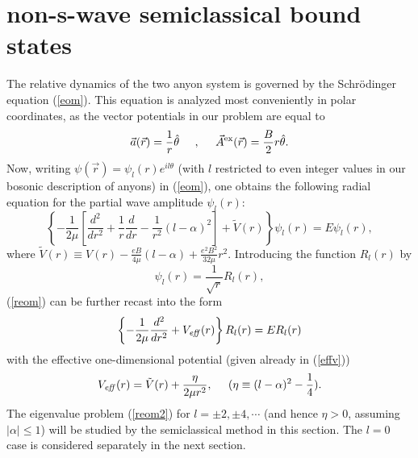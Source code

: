 \documentclass[a4paper,aps,eqsecnum,preprint,preprintnumbers,12pt]{revtex4}
\begin{document}
\section{non-s-wave semiclassical bound states}

The relative dynamics of the two anyon system is governed by the
Schr\"{o}dinger equation (\ref{eom}). This equation is analyzed
most conveniently in polar coordinates, as the vector potentials
in our problem are equal to
\begin{equation}
\vec{a}(\vec{r}) = \frac{1}{r} \hat{\theta} \;\;\;\;\; ,
\;\;\;\;\; \vec{A}^{\rm ex}(\vec{r}) = \frac{B}{2} r \hat{\theta}.
\end{equation}
Now, writing $\psi(\vec{r}) = \psi_{l}(r) e^{il\theta}$ (with $l$
restricted to even integer values in our bosonic description of
anyons) in (\ref{eom}), one obtains the following radial equation
for the partial wave amplitude $\psi_{l}(r)$:
\begin{equation} \label{reom}
\left\{ -\frac{1}{2\mu} \left[ \frac{d^{2}}{dr^{2}} + \frac{1}{r}
\frac{d}{dr} - \frac{1}{r^{2}} (l-\alpha)^{2} \right] +
\tilde{V}(r) \right\} \psi_{l}(r) = E \psi_{l}(r),
\end{equation}
where $\tilde{V}(r) \equiv V(r) - \displaystyle \frac{eB}{4\mu}
(l-\alpha) + \frac{e^{2}B^{2}}{32\mu} r^{2}$. Introducing the
function $R_{l}(r)$ by
\begin{equation}
\psi_{l}(r) = \displaystyle \frac{1}{\sqrt{r}} R_{l}(r),
\end{equation}
(\ref{reom}) can be further recast into the form
\begin{equation} \label{reom2}
\left\{ -\frac{1}{2\mu} \frac{d^{2}}{dr^{2}} + V_{\it eff}(r)
\right\} R_{l}(r) = E R_{l}(r)
\end{equation}
with the effective one-dimensional potential (given already in
(\ref{effv}))
\begin{equation} \label{veff}
V_{\it eff}(r) = \tilde{V}(r) + \frac{\eta}{2\mu r^{2}},
\;\;\;\;\; (\eta \equiv (l-\alpha)^{2} - \frac{1}{4}).
\end{equation}
The eigenvalue problem (\ref{reom2}) for $l = \pm 2, \pm 4,
\cdots$ (and hence $\eta>0$, assuming $|\alpha| \leq 1$) will be
studied by the semiclassical method in this section. The $l=0$
case is considered separately in the next section.
\end{document}
